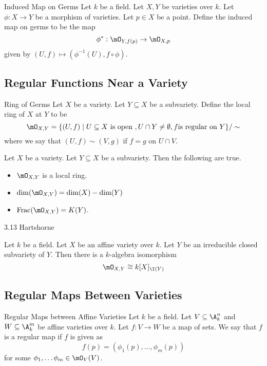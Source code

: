 \documentclass[a4paper]{article}
\begin{document}
\begin{defn}{Induced Map on Germs}{} Let $k$ be a field. Let $X,Y$ be varieties over $k$. Let $\phi:X\to Y$ be a morphism of varieties. Let $p\in X$ be a point. Define the induced map on germs to be the map $$\phi^\ast:\mO_{Y,f(p)}\to\mO_{X,p}$$ given by $(U,f)\mapsto(\phi^{-1}(U),f\circ\phi)$. 
\end{defn}

\subsection{Regular Functions Near a Variety}
\begin{defn}{Ring of Germs}{} Let $X$ be a variety. Let $Y\subseteq X$ be a subvariety. Define the local ring of $X$ at $Y$ to be $$\mO_{X,Y}=\{(U,f)\;|\;U\subseteq X\text{ is open }, U\cap Y\neq\emptyset, f\text{is regular on }Y\}/\sim$$ where we say that $(U,f)\sim(V,g)$ if $f=g$ on $U\cap V$. 
\end{defn}

\begin{prp}{}{} Let $X$ be a variety. Let $Y\subseteq X$ be a subvariety. Then the following are true. 
\begin{itemize}
\item $\mO_{X,Y}$ is a local ring. 
\item $\dim(\mO_{X,Y})=\dim(X)-\dim(Y)$
\item $\text{Frac}(\mO_{X,Y})=K(Y)$. 
\end{itemize}
\end{prp}

3.13 Hartshorne

\begin{prp}{}{} Let $k$ be a field. Let $X$ be an affine variety over $k$. Let $Y$ be an irreducible closed subvariety of $Y$. Then there is a $k$-algebra isomorphism $$\mO_{X,Y}\cong k[X]_{\I(Y)}$$
\end{prp}

\subsection{Regular Maps Between Varieties}
\begin{defn}{Regular Maps between Affine Varieties}{} Let $k$ be a field. Let $V\subseteq\A_k^n$ and $W\subseteq\A_k^m$ be affine varieties over $k$. Let $f:V\to W$ be a map of sets. We say that $f$ is a regular map if $f$ is given as $$f(p)=(\phi_1(p),\dots,\phi_m(p))$$ for some $\phi_1,\dots\phi_m\in\mO_V(V)$. 
\end{defn}
\end{document}
